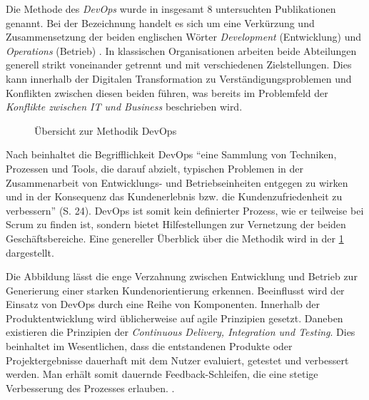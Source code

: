 Die Methode des \textit{DevOps} wurde in insgesamt 8 untersuchten Publikationen genannt. Bei der Bezeichnung handelt es sich um eine Verkürzung und Zusammensetzung der beiden englischen Wörter \textit{Development} (Entwicklung) und \textit{Operations} (Betrieb) \cite[S. 23]{alt_innovationsorientiertes_2017}. In klassischen Organisationen arbeiten beide Abteilungen generell strikt voneinander getrennt und mit verschiedenen Zielstellungen. Dies kann innerhalb der Digitalen Transformation zu Verständigungsproblemen und Konflikten zwischen diesen beiden führen, was bereits im Problemfeld der \textit{Konflikte zwischen IT und Business} beschrieben wird.


\begin{figure}[H]
	\centering
	\caption[Übersicht zur Methodik DevOps]{Übersicht zur Methodik DevOps \protect \cite[S. 28]{alt_innovationsorientiertes_2017}}
	\label{fig:devops}
\end{figure}

Nach  beinhaltet die Begrifflichkeit DevOps ``eine Sammlung von Techniken, Prozessen und Tools, die darauf abzielt, typischen Problemen in der Zusammenarbeit von Entwicklungs- und Betriebseinheiten entgegen zu wirken und in der Konsequenz das Kundenerlebnis bzw. die Kundenzufriedenheit zu verbessern'' (S. 24). DevOps ist somit kein definierter Prozess, wie er teilweise bei Scrum zu finden ist, sondern bietet Hilfestellungen zur Vernetzung der beiden Geschäftsbereiche. Eine genereller Überblick über die Methodik wird in der \ref{fig:devops} dargestellt.


Die Abbildung lässt die enge Verzahnung zwischen Entwicklung und Betrieb zur Generierung einer starken Kundenorientierung erkennen. Beeinflusst wird der Einsatz von DevOps durch eine Reihe von Komponenten. Innerhalb der Produktentwicklung wird üblicherweise auf agile Prinzipien gesetzt. Daneben existieren die Prinzipien der \textit{Continuous Delivery, Integration und Testing}. Dies beinhaltet im Wesentlichen, dass die entstandenen Produkte oder Projektergebnisse dauerhaft mit dem Nutzer evaluiert, getestet und verbessert werden. Man erhält somit dauernde Feedback-Schleifen, die eine stetige Verbesserung des Prozesses erlauben. \cite{alt_innovationsorientiertes_2017}.

